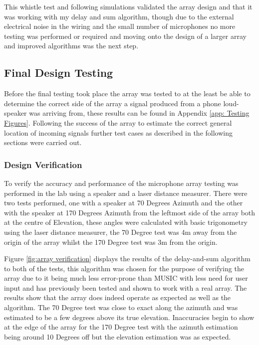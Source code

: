 \documentclass{UoNMCHA}
\numberwithin{equation}{section}
\begin{document}
    This whistle test and following simulations validated the array design and that it was working with my delay and sum algorithm, though due to the external electrical noise in the wiring and the small number of microphones no more testing was performed or required and moving onto the design of a larger array and improved algorithms was the next step.
    
\newpage
\subsection{Final Design Testing} \label{sec:Second Array Testing}
    Before the final testing took place the array was tested to at the least be able to determine the correct side of the array a signal produced from a phone loud-speaker was arriving from, these results can be found in Appendix \ref{app: Testing Figures}. Following the success of the array to estimate the correct general location of incoming signals further test cases as described in the following sections were carried out.
\subsubsection{Design Verification} \label{sec:Design Verification Testing}
    To verify the accuracy and performance of the microphone array testing was performed in the lab using a speaker and a laser distance measurer. There were two tests performed, one with a speaker at 70 Degrees Azimuth and the other with the speaker at 170 Degrees Azimuth from the leftmost side of the array both at the centre of Elevation, these angles were calculated with basic trigonometry using the laser distance measurer, the 70 Degree test was 4m away from the origin of the array whilst the 170 Degree test was 3m from the origin.

    Figure \ref{fig:array verification} displays the results of the delay-and-sum algorithm to both of the tests, this algorithm was chosen for the purpose of verifying the array due to it being much less error-prone than MUSIC with less need for user input and has previously been tested and shown to work with a real array. The results show that the array does indeed operate as expected as well as the algorithm. The 70 Degree test was close to exact along the azimuth and was estimated to be a few degrees above its true elevation. Inaccuracies begin to show at the edge of the array for the 170 Degree test with the azimuth estimation being around 10 Degrees off but the elevation estimation was as expected.
    
\end{document}
